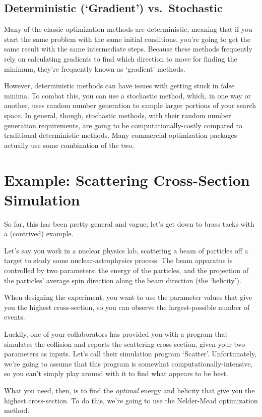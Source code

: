 \documentclass{article}
\begin{document}
  \subsection*{Deterministic (`Gradient') vs.\ Stochastic}
		Many of the classic optimization methods are deterministic,
		meaning that if you start the same problem with the same initial
		conditions, you're going to get the same result with the same
		intermediate steps. Because these methods frequently rely
		on calculating gradients to find which direction to move
		for finding the minimum, they're frequently known as `gradient'
		methods. 

		However, deterministic methods can have issues with getting stuck
		in false minima. To combat this, you can use a stochastic method,
		which, in one way or another, uses random number generation to sample larger
		portions of your search space. In general, though, stochastic methods,
		with their random number generation requirements, are going to 
		be computationally-costly compared to traditional deterministic
		methods. Many commercial optimization packages actually use some
		combination of the two.

\section*{Example: Scattering Cross-Section Simulation}
	So far, this has been pretty general and vague; let's get down
	to brass tacks with a (contrived) example. 

	Let's say you work in a nuclear physics lab, scattering a beam
	of particles off a target to study some nuclear-astrophysics process.
	The beam apparatus is controlled by two parameters: the energy of
	the particles, and the projection of the particles' average spin direction along
	the beam direction (the `helicity'). 

	When designing the experiment, you want to use the parameter values
  that give you the highest cross-section, so you can observe the largest-possible
	number of events.

	Luckily, one of your collaborators has provided you with a program that simulates
	the collision and reports the scattering cross-section, given your two
	parameters as inputs. Let's call their simulation program `Scatter'.
	Unfortunately, we're going to assume 
	that this program is somewhat computationally-intensive,
	so you can't simply play around with it to find what appears
	to be best.

	What you need, then, is to find the \emph{optimal} energy and helicity
	that give you the highest cross-section. To do this, we're going to use
	the Nelder-Mead optimization method.
\end{document}
